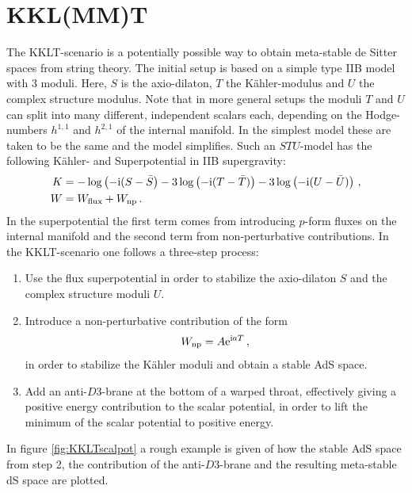 \documentclass[a4paper,12pt]{report}
\newcommand{\bea}{\begin{equation}\begin{aligned}}
\newcommand{\eea}{\end{aligned}\end{equation}}
\def\rmi{{\rm i}}
\def\rme{{\rm e}}
\begin{document}
\section{KKL(MM)T}
\label{sec:kklt}%
The KKLT-scenario \cite{Kachru:2003aw,Kachru:2003sx} is a potentially possible way to obtain meta-stable de Sitter spaces from string theory. The initial setup is based on a simple type IIB model with 3 moduli. Here, $S$ is the axio-dilaton, $T$ the Kähler-modulus and $U$ the complex structure modulus. Note that in more general setups the moduli $T$ and $U$ can split into many different, independent scalars each, depending on the Hodge-numbers $h^ {1,1}$ and $h^ {2,1}$ of the internal manifold. In the simplest model these are taken to be the same and the model simplifies. Such an $STU$-model has the following Kähler- and Superpotential in IIB supergravity:
\bea
K &= - \log \left( -\rmi (S- \bar{S}\right) - 3 \log\left(-\rmi (T- \bar{T}) \right) - 3 \log\left(-\rmi (U- \bar{U}) \right)\,, \\
W &= W_{\text{flux}} + W_{\text{np}}\,.
\label{eq:KWkklt}
\eea
In the superpotential the first term comes from introducing $p$-form fluxes on the internal manifold and the second term from non-perturbative contributions. In the KKLT-scenario one follows a three-step process:
\begin{enumerate}
\item Use the flux superpotential in order to stabilize the axio-dilaton $S$ and the complex structure moduli $U$.
\item Introduce a non-perturbative contribution of the form
\begin{equation}
W_{\text{np}} = A \rme^{\rmi a T}\,,
\end{equation}
in order to stabilize the Kähler moduli and obtain a stable AdS space.
\item Add an anti-$D3$-brane at the bottom of a warped throat, effectively giving a positive energy contribution to the scalar potential, in order to lift the minimum of the scalar potential to positive energy.
\end{enumerate}
In figure \ref{fig:KKLTscalpot} a rough example is given of how the stable AdS space from step 2, the contribution of the anti-$D3$-brane and the resulting meta-stable dS space are plotted.
\end{document}
